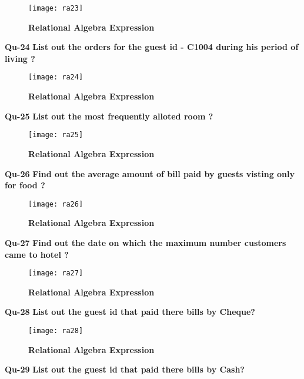 \documentclass[a4,12pt]{report}
\begin{document}
\begin{figure}[hbtp]
\centering
\texttt{[image: ra23]}
\caption{\textbf{{\color{red}Relational Algebra Expression}}}
\end{figure}

\newpage
\textbf{Qu-24} \textbf{ List out the orders for the guest id - C1004 during his period of living ? }\\

\begin{figure}[hbtp]
\centering
\texttt{[image: ra24]}
\caption{\textbf{{\color{red}Relational Algebra Expression}}}
\end{figure}

\textbf{Qu-25} \textbf{ List out the most frequently alloted room ? }\\

\begin{figure}[hbtp]
\centering
\texttt{[image: ra25]}
\caption{\textbf{{\color{red}Relational Algebra Expression}}}
\end{figure}

\newpage
\textbf{Qu-26} \textbf{ Find out the average amount of bill paid by guests visting only for food ? }\\

\begin{figure}[hbtp]
\centering
\texttt{[image: ra26]}
\caption{\textbf{{\color{red}Relational Algebra Expression}}}
\end{figure}

\textbf{Qu-27} \textbf{ Find out the date on which the maximum number customers came to hotel ? }\\

\begin{figure}[hbtp]
\centering
\texttt{[image: ra27]}
\caption{\textbf{{\color{red}Relational Algebra Expression}}}
\end{figure}

\newpage
\textbf{Qu-28} \textbf{ List out the guest id that paid there bills by Cheque?
}\\

\begin{figure}[hbtp]
\centering
\texttt{[image: ra28]}
\caption{\textbf{{\color{red}Relational Algebra Expression}}}
\end{figure}


\textbf{Qu-29} \textbf{ List out the guest id that paid there bills by Cash?
}\\
\end{document}
